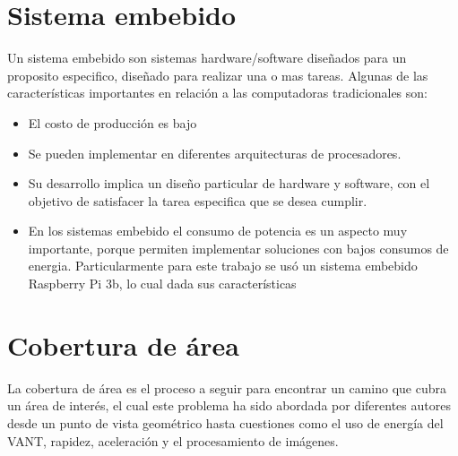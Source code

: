 \documentclass[]{report}
\begin{document}
\section{Sistema embebido}
Un sistema embebido son sistemas hardware/software diseñados para un proposito especifico, diseñado para realizar una o mas tareas. Algunas de las características importantes en relación a las computadoras tradicionales son:
\begin{itemize}
	\item El costo de producción es bajo
	\item Se pueden implementar en diferentes arquitecturas de procesadores.
	\item Su desarrollo implica un diseño particular de hardware y software, con el objetivo de satisfacer la tarea especifica que se desea cumplir.
	\item En los sistemas embebido el consumo de potencia es un aspecto muy importante, porque permiten implementar soluciones con bajos consumos de energia.\cite{jimenez2011}
Particularmente para este trabajo se usó un sistema embebido Raspberry Pi 3b, lo cual dada sus características 

\end{itemize}

\section{Cobertura de área}
La cobertura de área es el proceso a seguir para encontrar un camino que cubra un área de interés, el cual este problema ha sido abordada por diferentes autores desde un punto de vista geométrico hasta cuestiones como el uso de energía del VANT, rapidez, aceleración y el procesamiento de imágenes. \cite{DiFranco}
\end{document}
